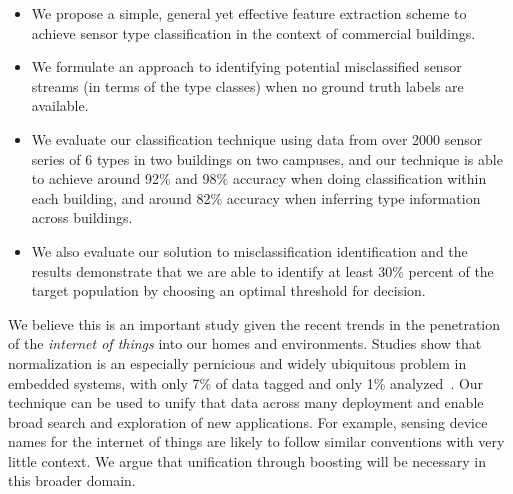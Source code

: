 \begin{itemize}
\item We propose a simple, general yet effective feature extraction scheme to achieve sensor type classification in the context of commercial buildings.
\item We formulate an approach to identifying potential misclassified sensor streams (in terms of the type classes) when no ground truth labels are available.
\item We evaluate our classification technique using data from over 2000 sensor series of 6 types in two buildings on two campuses, and our technique is able to achieve around 92\% and 98\% accuracy when doing classification within each building, and around 82\% accuracy when inferring type information across buildings.
\item We also evaluate our solution to misclassification identification and the results demonstrate that we are able to identify at least 30\% percent of the target population by choosing an optimal threshold for decision.
\end{itemize}


We believe this is an important study given the recent trends in the penetration
of the \emph{internet of things} into our homes and environments.  Studies show that normalization is an especially pernicious
and widely ubiquitous problem in embedded systems, with only 7\% of data tagged and only 1\% analyzed~\cite{kpcb}.
Our technique can be used to unify that data across many deployment and enable broad search 
and exploration of new applications.  For example, sensing device names for 
the internet of things are likely to follow similar conventions with very little 
context.  We argue that unification through boosting will be necessary in this broader domain.




 






